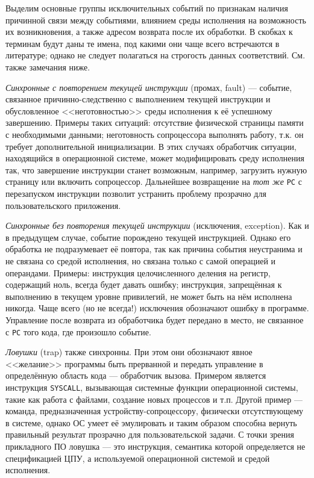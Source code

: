 Выделим основные группы исключительных событий по признакам наличия причинной связи между событиями, влиянием среды исполнения на возможность их возникновения, а также адресом возврата после их обработки. В скобках к терминам будут даны те имена, под какими они чаще всего встречаются в литературе; однако не следует полагаться на строгость данных соответствий. См. также замечания ниже.

\begin{itemize*}
    \item \textit{Синхронные с повторением текущей инструкции} (промах, \abbr fault) --- событие, связанное причинно-следственно с выполнением текущей инструкции и обусловленное <<неготовностью>> среды исполнения к её успешному завершению. Примеры таких ситуаций: отсутствие физической страницы памяти с необходимыми данными; неготовность сопроцессора выполнять работу, т.к. он требует дополнительной инициализации. В этих случаях обработчик ситуации, находящийся в операционной системе, может модифицировать среду исполнения так, что завершение инструкции станет возможным, например, загрузить нужную страницу или включить сопроцессор. Дальнейшее возвращение на \emph{тот же} \texttt{PC} с перезапуском инструкции позволит устранить проблему прозрачно для пользовательского приложения. 

    \item \textit{Синхронные без повторения текущей инструкции} (исключения, \abbr ex\-cep\-tion).  Как и в предыдущем случае, событие порождено текущей инструкцией. Однако его обработка не подразумевает её повтора, так как причина события неустранима и не связана со средой исполнения, но связана только с самой операцией и операндами. Примеры: инструкция целочисленного деления на регистр, содержащий ноль, всегда будет давать ошибку; инструкция, запрещённая к выполнению в текущем уровне привилегий, не может быть на нём исполнена никогда. Чаще всего (но не всегда!) исключения обозначают ошибку в программе. Управление после возврата из обработчика будет передано в место, не связанное с \texttt{PC} того кода, где произошло событие.

    \item \textit{Ловушки} (\abbr trap) также синхронны. При этом они обозначают явное <<желание>> программы быть прерванной и передать управление в определённую область кода --- обработчик вызова. Примером является инструкция \texttt{SYSCALL}, вызывающая системные функции операционной системы, такие как работа с файлами, создание новых процессов и т.п. Другой пример --- команда, предназначенная устройству-сопроцессору, физически отсутствующему в системе, однако ОС умеет её эмулировать и таким образом способна вернуть правильный результат прозрачно для пользовательской задачи. С точки зрения прикладного ПО ловушка --- это инструкция, семантика которой определяется не спецификацией ЦПУ, а используемой операционной системой и средой исполнения.


\end{itemize*}
